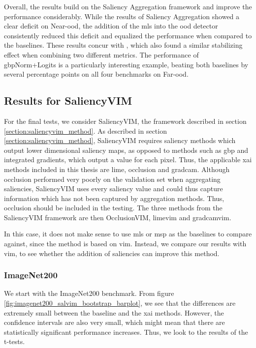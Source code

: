 \documentclass[UKenglish]{uiomasterthesis} %
\theoremstyle{definition}
\begin{document}
Overall, the results build on the Saliency Aggregation framework and improve the performance considerably. While the results of Saliency Aggregation showed a clear deficit on Near-\ac{ood}, the addition of the \ac{mls} into the \ac{ood} detector consistently reduced this deficit and equalized the performance when compared to the baselines. These results concur with \cite{combood}, which also found a similar stabilizing effect when combining two different metrics. The performance of \ac{gbp}Norm+Logits is a particularly interesting example, beating both baselines by several percentage points on all four benchmarks on Far-\ac{ood}.

\subsection{Results for SaliencyVIM}

For the final tests, we consider SaliencyVIM, the framework described in section \ref{section:saliencyvim_method}. As described in section \ref{section:saliencyvim_method}, SaliencyVIM requires saliency methods which output lower dimensional saliency maps, as opposed to methods such as \ac{gbp} and integrated gradients, which output a value for each pixel. Thus, the applicable \ac{xai} methods included in this thesis are \ac{lime}, occlusion and \ac{gradcam}. Although occlusion performed very poorly on the validation set when aggregating saliencies, SaliencyVIM uses every saliency value and could thus capture information which has not been captured by aggregation methods. Thus, occlusion should be included in the testing. The three methods from the SaliencyVIM framework are then OcclusionVIM, \ac{lime}\ac{vim} and \ac{gradcam}\ac{vim}. 

In this case, it does not make sense to use \ac{mls} or \ac{msp} as the baselines to compare against, since the method is based on \ac{vim}. Instead, we compare our results with \ac{vim}, to see whether the addition of saliencies can improve this method.

\subsubsection{ImageNet200}

We start with the ImageNet200 benchmark. From figure \ref{fig:imagenet200_salvim_bootstrap_barplot}, we see that the differences are extremely small between the baseline and the \ac{xai} methods. However, the confidence intervals are also very small, which might mean that there are statistically significant performance increases. Thus, we look to the results of the t-tests.
\end{document}
